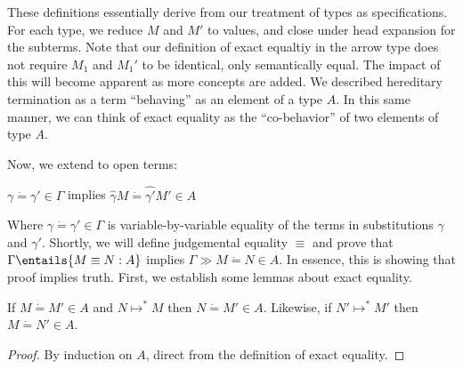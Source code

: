 \documentclass[letterpaper]{article}
\begin{document}
These definitions essentially derive from our treatment of types as specifications. For each type, we reduce $M$ and $M'$ to values, and close under head expansion for the subterms. 
Note that our definition of exact equaltiy in the arrow type does not require $M_1$ and $M_1'$ to be identical, only semantically equal. 
The impact of this will become apparent as more concepts are added. We described hereditary termination as a term ``behaving'' as an element of a type $A$.
In this same manner, we can think of exact equality as the ``co-behavior'' of two elements of type $A$.

Now, we extend to open terms:


\begin{definition}[$\Gamma \gg M \dot{=} M' \in A$]
    $\gamma \dot{=} \gamma' \in \Gamma$ implies $\hat{\gamma} M \dot{=} \hat{\gamma'} M' \in A$ 
\end{definition}

Where $\gamma \dot{=} \gamma' \in \Gamma$ is variable-by-variable equality of the terms in substitutions $\gamma$ and $\gamma'$. 
Shortly, we will define judgemental equality $\equiv$ and prove that $\Gamma \entails{M \equiv N : A}$ implies $\Gamma \gg M \dot{=} N \in A$.
In essence, this is showing that proof implies truth. First, we establish some lemmas about exact equality.

\begin{lemma}\label{lem:headexpansion}
    If $M \dot{=} M' \in A$ and $N \mapsto^* M$ then $N \dot{=} M' \in A$. Likewise, if $N' \mapsto^* M'$ then $M \dot{=} N' \in A$. 
\end{lemma}
\begin{proof}
By induction on $A$, direct from the definition of exact equality.
\end{proof}
\end{document}
